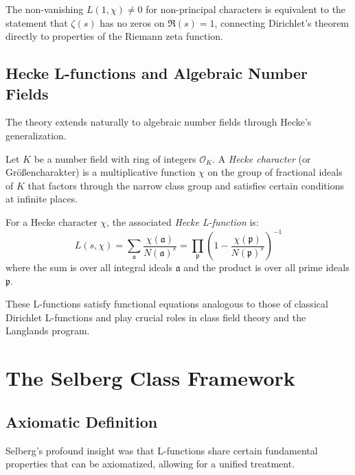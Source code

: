 \begin{remark}
The non-vanishing $L(1,\chi) \neq 0$ for non-principal characters is equivalent to the statement that $\zeta(s)$ has no zeros on $\Re(s) = 1$, connecting Dirichlet's theorem directly to properties of the Riemann zeta function.
\end{remark}

\subsection{Hecke L-functions and Algebraic Number Fields}

The theory extends naturally to algebraic number fields through Hecke's generalization.

\begin{definition}
Let $K$ be a number field with ring of integers $\mathcal{O}_K$. A \emph{Hecke character} (or Größencharakter) is a multiplicative function $\chi$ on the group of fractional ideals of $K$ that factors through the narrow class group and satisfies certain conditions at infinite places.
\end{definition}

\begin{definition}
For a Hecke character $\chi$, the associated \emph{Hecke L-function} is:
\begin{equation}
L(s,\chi) = \sum_{\mathfrak{a}} \frac{\chi(\mathfrak{a})}{N(\mathfrak{a})^s} = \prod_{\mathfrak{p}} \left(1 - \frac{\chi(\mathfrak{p})}{N(\mathfrak{p})^s}\right)^{-1}
\end{equation}
where the sum is over all integral ideals $\mathfrak{a}$ and the product is over all prime ideals $\mathfrak{p}$.
\end{definition}

These L-functions satisfy functional equations analogous to those of classical Dirichlet L-functions and play crucial roles in class field theory and the Langlands program.

\section{The Selberg Class Framework}
\label{sec:selberg-class}

\subsection{Axiomatic Definition}

Selberg's profound insight was that L-functions share certain fundamental properties that can be axiomatized, allowing for a unified treatment.

